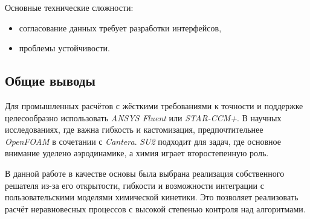 Основные технические сложности:

\begin{itemize}
    \item согласование данных требует разработки интерфейсов,
    \item проблемы устойчивости.
\end{itemize}

\subsection{Общие выводы}

Для промышленных расчётов с жёсткими требованиями к точности и поддержке целесообразно использовать \textit{ANSYS Fluent} или \textit{STAR-CCM+}. В научных исследованиях, где важна гибкость и кастомизация, предпочтительнее \textit{OpenFOAM} в сочетании с \textit{Cantera}. \textit{SU2} подходит для задач, где основное внимание уделено аэродинамике, а химия играет второстепенную роль.

В данной работе в качестве основы была выбрана реализация собственного решателя из-за его открытости, гибкости и возможности интеграции с пользовательскими моделями химической кинетики. Это позволяет реализовать расчёт неравновесных процессов с высокой степенью контроля над алгоритмами.
